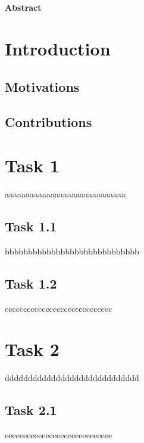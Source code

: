 \documentclass[a4paper,11pt,oneside]{book}
\begin{document}
\newpage
\thispagestyle{empty}

\begin{center}
\chapter*{}
\thispagestyle{empty}
{\Huge \textbf{Abstract}}\\
\vspace{15mm}
\end{center}

\tableofcontents \thispagestyle{empty}

\chapter*{Introduction}


\section{Motivations} 


\section{Contributions}



\chapter{Task 1}
\label{ch:task1}
aaaaaaaaaaaaaaaaaaaaaaaaaaaaa

\section{Task 1.1}
bbbbbbbbbbbbbbbbbbbbbbbbbbbbb

\section{Task 1.2}
ccccccccccccccccccccccccccccc



\chapter{Task 2}
ddddddddddddddddddddddddddddd

\section{Task 2.1}
eeeeeeeeeeeeeeeeeeeeeeeeeeeee
\end{document}
